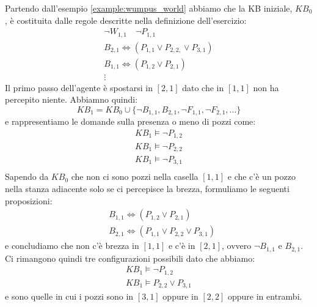 \begin{example}
	Partendo dall'esempio \ref{example:wumpus_world} abbiamo che la KB iniziale, $KB_0$, è costituita dalle regole descritte nella definizione dell'esercizio:
		\begin{gather*}
			\neg W_{1,1} \quad \neg P_{1,1} \\
			B_{2,1} \Leftrightarrow (P_{1,1} \lor P_{2,2,} \lor P_{3,1})\\
			B_{1,1} \Leftrightarrow (P_{1,2} \lor P_{2,1})\\
			\vdots
		\end{gather*}
		Il primo passo dell'agente è spostarsi in $[2,1]$ dato che in $[1,1]$ non ha percepito niente. Abbiamno quindi:
		\begin{equation*}
			KB_1 = KB_0 \cup \{\neg B_{1,1}, B_{2,1}, \neg F_{1,1}, \neg F_{2,1}, \ldots\}
		\end{equation*}
		e rappresentiamo le domande sulla presenza o meno di pozzi come:
		\begin{equation*}
			\begin{split}
				KB_1 \models \neg P_{1,2} \\
				KB_1 \models \neg P_{2,2} \\
				KB_1 \models \neg P_{3,1} \\
			\end{split}
		\end{equation*}
		Sapendo da $KB_0$ che non ci sono pozzi nella casella $[1,1]$ e che c'è un pozzo nella stanza adiacente solo se ci percepisce la brezza, formuliamo le seguenti proposizioni:
		\begin{equation*}
			\begin{split}
				& B_{1,1} \Leftrightarrow (P_{1,2} \lor P_{2,1}) \\
				& B_{2,1} \Leftrightarrow (P_{1,1} \lor P_{2,2} \lor P_{3,1})
			\end{split}
		\end{equation*}
		e concludiamo che non c'è brezza in $[1,1]$ e c'è in $[2,1]$, ovvero $\neg B_{1,1}$ e $B_{2,1}$.\\
		Ci rimangono quindi tre configurazioni possibili dato che abbiamo:
		\begin{gather*}
			KB_1 \models \neg P_{1,2}\\
			KB_1 \models P_{2,2}\lor P_{3,1}
		\end{gather*}
		e sono quelle in cui i pozzi sono in $[3,1]$ oppure in $[2,2]$ oppure in entrambi.
\end{example}